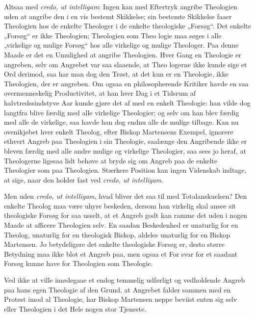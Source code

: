 \documentclass[12pt]{book}
\newcommand{\opage}[1]{\marginnote{\footnotesize\textit{[#1]}}}
\begin{document}
Altsaa med \textit{credo, ut intelligam}: Ingen kan med
Eftertryk angribe Theologien uden at angribe den i en vis
bestemt Skikkelse; sin bestemte Skikkelse faaer Theologien hos
de enkelte Theologer i de enkelte theologiske „Forsøg“. Det
enkelte „Forsøg“ er ikke Theologien; Theologien som Theo\-%
logie maa søges i alle „virkelige og mulige Forsøg“ hos alle
virkelige og mulige Theologer. Paa denne Maade er det en
Umulighed at angribe Theologien. Hver Gang en Theologie
er angreben, selv om Angrebet var saa slaaende, at Theo\-%
logerne ikke kunde sige et Ord derimod, saa har man dog
den Trøst, at det kun er en Theologie, ikke Theologien, der
er angreben. Om ogsaa en philosopherende Kritiker havde
en saa overmenneskelig Productivitet, at han hver Dag i et
Tidsrum af halvtredssindstyve Aar kunde gjøre det af med
en enkelt Theologie: han vilde dog langtfra blive færdig
med alle virkelige Theologier; og selv om han blev færdig
med alle de virkelige, saa havde han dog endnu alle de
mulige tilbage. Kan nu ovenikjøbet hver enkelt Theolog,
efter Biskop Martensens Exempel, ignorere ethvert Angreb paa
Theologien i sin Theologie, saalænge den Angribende ikke er
\opage{79}\setcounter{footnote}{0}%
bleven færdig med alle andre mulige og virkelige Theologier, saa
sees jo heraf, at Theologerne ligesaa lidt behøve at bryde sig
om Angreb paa de enkelte Theologier som paa Theologien.
Stærkere Position kan ingen Videnskab indtage, at sige, naar
den holder fast ved \textit{credo, ut intelligam}.

Men uden \textit{credo, ut intelligam}, hvad bliver det saa
til med Totalanskuelsen? Den enkelte Theolog maa være
uhyre beskeden, dersom han virkelig skal ansee sit theologiske
Forsøg for saa usselt, at et Angreb godt kan ramme det
uden i nogen Maade at afficere Theologien selv. En saadan
Beskedenhed er unaturlig for en Theolog, unaturlig for en
theologisk Biskop, aldeles unaturlig for en Biskop Martensen.
Jo betydeligere det enkelte theologiske Forsøg er, desto større
Betydning maa ikke blot et Angreb paa, men ogsaa et For\-%
svar for et saadant Forsøg kunne have for Theologien som
Theologie.

Ved ikke at ville imødegaae et endog temmelig udførligt
og vedholdende Angreb paa hans egen Theologie af den
Grund, at Angrebet falder sammen med en Protest imod al
Theologie, har Biskop Martensen neppe beviist enten sig selv
eller Theologien i det Hele nogen stor Tjeneste.
\end{document}
